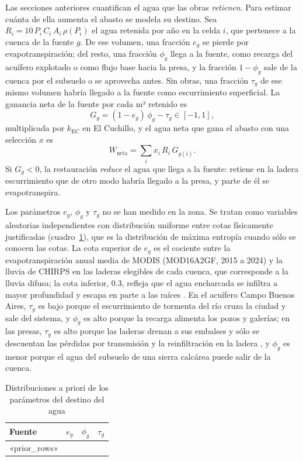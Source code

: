 Las secciones anteriores cuantifican el agua que las obras \emph{retienen}. Para estimar cuánta de ella aumenta el abasto se modela su destino. Sea $R_i=10\,P_i\,C_i\,A_i\,\rho(P_i)$ el agua retenida por año en la celda $i$, que pertenece a la cuenca de la fuente $g$. De ese volumen, una fracción $e_g$ se pierde por evapotranspiración; del resto, una fracción $\phi_g$ llega a la fuente, como recarga del acuífero explotado o como flujo base hacia la presa, y la fracción $1-\phi_g$ sale de la cuenca por el subsuelo o se aprovecha antes. Sin obras, una fracción $\tau_g$ de ese mismo volumen habría llegado a la fuente como escurrimiento superficial. La ganancia neta de la fuente por cada m³ retenido es
\begin{equation}
G_g=(1-e_g)\,\phi_g-\tau_g\in[-1,1],
\end{equation}
multiplicada por $k_{\text{EC}}$ en El Cuchillo, y el agua neta que gana el abasto con una selección $x$ es
\begin{equation}
W_{\text{neta}}=\sum_i x_i\,R_i\,G_{g(i)} .
\end{equation}
Si $G_g<0$, la restauración \emph{reduce} el agua que llega a la fuente: retiene en la ladera escurrimiento que de otro modo habría llegado a la presa, y parte de él se evapotranspira.

Los parámetros $e_g$, $\phi_g$ y $\tau_g$ no se han medido en la zona. Se tratan como variables aleatorias independientes con distribución uniforme entre cotas físicamente justificadas (cuadro~\ref{tab:priores}), que es la distribución de máxima entropía cuando sólo se conocen las cotas. La cota superior de $e_g$ es el cociente entre la evapotranspiración anual media de MODIS (MOD16A2GF, 2015 a 2024) y la lluvia de CHIRPS en las laderas elegibles de cada cuenca, que corresponde a la lluvia difusa; la cota inferior, 0.3, refleja que el agua encharcada se infiltra a mayor profundidad y escapa en parte a las raíces . En el acuífero Campo Buenos Aires, $\tau_g$ es bajo porque el escurrimiento de tormenta del río cruza la ciudad y sale del sistema, y $\phi_g$ es alto porque la recarga alimenta los pozos y galerías; en las presas, $\tau_g$ es alto porque las laderas drenan a sus embalses y sólo se descuentan las pérdidas por transmisión y la reinfiltración en la ladera , y $\phi_g$ es menor porque el agua del subsuelo de una sierra calcárea puede salir de la cuenca.

\begin{table}[H]\centering\small
\caption{Distribuciones a priori de los parámetros del destino del agua}\label{tab:priores}
\begin{tabularx}{\linewidth}{Xrrr}
\toprule
Fuente & $e_g$ & $\phi_g$ & $\tau_g$ \\
\midrule
«prior_rows»
\bottomrule
\end{tabularx}
\end{table}

